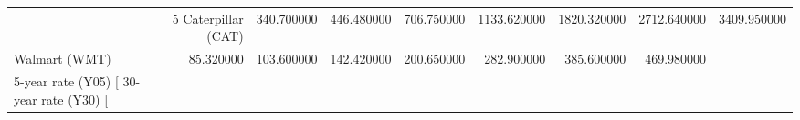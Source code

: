 \begin{tabular}{lrrrrrrr}
\toprule
 & 5%
\midrule
Caterpillar (CAT) & 340.700000 & 446.480000 & 706.750000 & 1133.620000 & 1820.320000 & 2712.640000 & 3409.950000 \\
Walmart (WMT) & 85.320000 & 103.600000 & 142.420000 & 200.650000 & 282.900000 & 385.600000 & 469.980000 \\
5-year rate (Y05) [%
30-year rate (Y30) [%
\bottomrule
\end{tabular}
